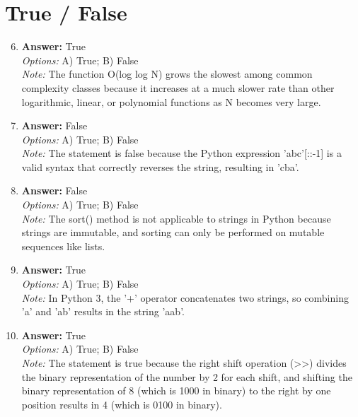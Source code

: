 \documentclass[12pt]{article}
\begin{document}
\section*{True / False}
\begin{enumerate}[label=\arabic*.]
\setcounter{enumi}{5}
\item \textbf{Answer:} True
\\ \textit{Options:} A) True; B) False
\\ \textit{Note:} The function O(log log N) grows the slowest among common complexity classes because it increases at a much slower rate than other logarithmic, linear, or polynomial functions as N becomes very large.
\item \textbf{Answer:} False
\\ \textit{Options:} A) True; B) False
\\ \textit{Note:} The statement is false because the Python expression 'abc'[::-1] is a valid syntax that correctly reverses the string, resulting in 'cba'.
\item \textbf{Answer:} False
\\ \textit{Options:} A) True; B) False
\\ \textit{Note:} The sort() method is not applicable to strings in Python because strings are immutable, and sorting can only be performed on mutable sequences like lists.
\item \textbf{Answer:} True
\\ \textit{Options:} A) True; B) False
\\ \textit{Note:} In Python 3, the '+' operator concatenates two strings, so combining 'a' and 'ab' results in the string 'aab'.
\item \textbf{Answer:} True
\\ \textit{Options:} A) True; B) False
\\ \textit{Note:} The statement is true because the right shift operation (\textgreater{}\textgreater{}) divides the binary representation of the number by 2 for each shift, and shifting the binary representation of 8 (which is 1000 in binary) to the right by one position results in 4 (which is 0100 in binary).
\end{enumerate}
\end{document}
